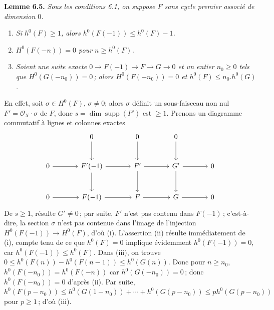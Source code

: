 \textbf{Lemme 6.5.} \emph{Sous les conditions 6.1, on suppose $F$ sans cycle premier associ\'e de dimension $0$.}
\begin{enumerate}[label=(\roman*)]
\item \emph{Si $h^0(F)\ge1$, alors $h^0(F(-1))\le h^0(F)-1$.}
\item \emph{$H^0(F(-n))=0$ pour $n\ge h^0(F)$.}
\item \emph{Soient une suite exacte $0\to F(-1)\to F\to G\to0$ et un entier $n_0\ge0$ tels que $H^0(G(-n_0))=0$\,; alors $H^0(F(-n_0))=0$ et $h^0(F)\le n_0.h^0(G)$.}
\end{enumerate}
En effet, soit $\sigma\in H^0(F)$, $\sigma\ne0$; alors $\sigma$ d\'efinit un sous-faisceau non nul $F'=\mathcal O_X\cdot\sigma$ de $F$, donc $s=\dim\operatorname{supp}(F')$ est $\ge1$. Prenons un diagramme commutatif \`a lignes et colonnes exactes
\[
\begin{tikzcd}[column sep=large,row sep=large]
&0 \arrow[d]&0 \arrow[d]&0 \arrow[d]&\\
0 \arrow[r]&F'(-1) \arrow[r] \arrow[d]&F' \arrow[r] \arrow[d]&G' \arrow[r] \arrow[d]&0\\
0 \arrow[r]&F(-1) \arrow[r]&F \arrow[r]&G \arrow[r]&0
\end{tikzcd}
\]
De $s\ge1$, r\'
esulte $G'\ne0$\,; par suite, $F'$ n'est pas contenu dans $F(-1)$\,; c'est-\`a-dire, la section $\sigma$ n'est pas contenue dans l'image de l'injection $H^0(F(-1))\to H^0(F)$, d'o\`u (i). L'assertion (ii) r\'esulte imm\'ediatement de (i), compte tenu de ce que $h^0(F)=0$ implique \'evidemment $h^0(F(-1))=0$, car $h^0(F(-1))\le h^0(F)$. Dans (iii), on trouve $0\le h^0(F(n))-h^0(F(n-1))\le h^0(G(n))$. Donc pour $n\ge n_0$, $h^0(F(-n_0))=h^0(F(-n))$ car $h^0(G(-n_0))=0$\,; donc $h^0(F(-n_0))=0$ d'apr\`es (ii). Par suite, $h^0(F(p-n_0))\le h^0(G(1-n_0))+\cdots+h^0(G(p-n_0))\le ph^0(G(p-n_0))$ pour $p\ge1$\,; d'o\`u (iii).

